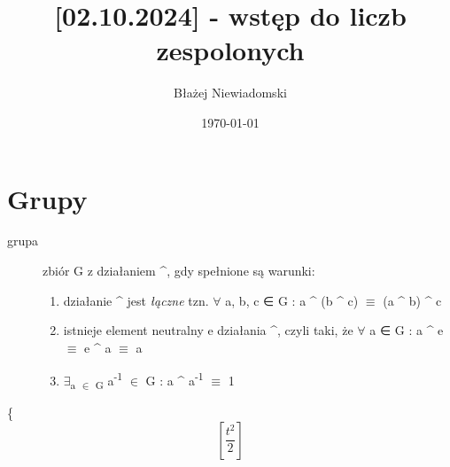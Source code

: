 \documentclass[11pt]{article}
\author{Błażej Niewiadomski}
\date{\today}
\title{{[}02.10.2024] - wstęp do liczb zespolonych}
\begin{document}
\maketitle
\tableofcontents

\section*{Grupy}
\label{sec:org12ffa52}

\begin{description}
\item[{grupa}] zbiór G z działaniem \^{}, gdy spełnione są warunki:

\begin{enumerate}
\item działanie \^{} jest \emph{łączne} tzn. \(\forall\) a, b, c ∈ G : a \^{} (b \^{} c) \(\equiv\) (a \^{} b) \^{} c
\item istnieje element neutralny e działania \^{}, czyli taki, że \(\forall\) a ∈ G : a \^{} e \(\equiv\) e \^{} a \(\equiv\) a
\item \(\exists\)\textsubscript{a \(\in\) G} a\textsuperscript{-1} \(\in\) G : a \^{} a\textsuperscript{-1} \(\equiv\) 1
\end{enumerate}
\end{description}

\{
\begin{equation}
\left[ \frac{t^{2}}{2} \right]
\end{equation}
\end{document}

